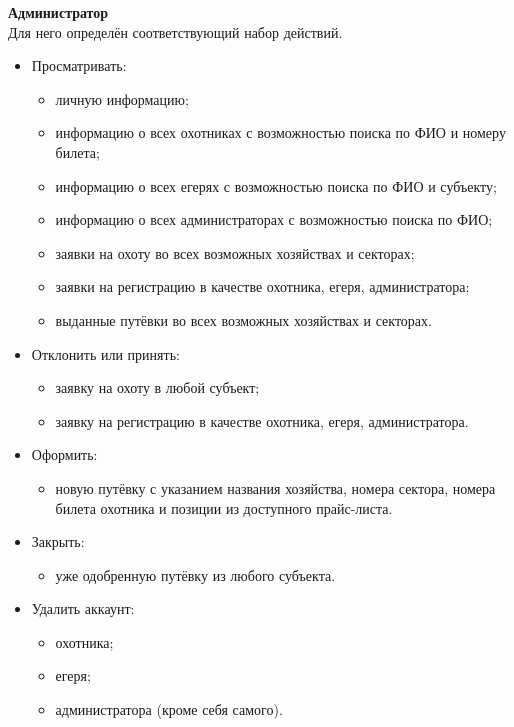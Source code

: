 		\textbf{Администратор}\\
		Для него определён соответствующий набор действий.
		\begin{itemize}
			\item Просматривать:
			\begin{itemize}
				\item личную информацию;
				\item информацию о всех охотниках с возможностью поиска по ФИО и номеру билета;
				\item информацию о всех егерях с возможностью поиска по ФИО и субъекту;
				\item информацию о всех администраторах с возможностью поиска по ФИО;
				\item заявки на охоту во всех возможных хозяйствах и секторах;
				\item заявки на регистрацию в качестве охотника, егеря, администратора;
				\item выданные путёвки во всех возможных хозяйствах и секторах.
			\end{itemize}
			\item Отклонить или принять:
			\begin{itemize} 
				\item заявку на охоту в любой субъект;
				\item заявку на регистрацию в качестве охотника, егеря, администратора.
			\end{itemize}
			\item Оформить:
			\begin{itemize} 
				\item новую путёвку с указанием названия хозяйства, номера сектора, номера билета охотника и позиции из доступного прайс-листа.
			\end{itemize} 
			\item Закрыть:
			\begin{itemize}
				\item уже одобренную путёвку из любого субъекта.
			\end{itemize}
			\item Удалить аккаунт:
			\begin{itemize} 
				\item охотника;
				\item егеря;
				\item администратора (кроме себя самого).
			\end{itemize}
		\end{itemize}
	
